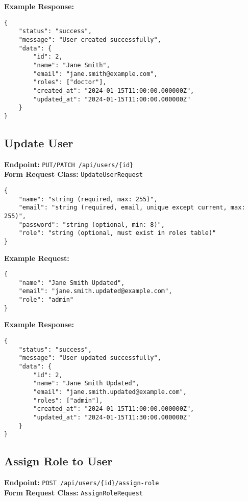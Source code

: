 \documentclass[12pt,a4paper]{article}
\begin{document}
\textbf{Example Response:}
\begin{lstlisting}[caption=Create User Example Response]
{
    "status": "success",
    "message": "User created successfully",
    "data": {
        "id": 2,
        "name": "Jane Smith",
        "email": "jane.smith@example.com",
        "roles": ["doctor"],
        "created_at": "2024-01-15T11:00:00.000000Z",
        "updated_at": "2024-01-15T11:00:00.000000Z"
    }
}
\end{lstlisting}

\subsection{Update User}
\textbf{Endpoint:} \texttt{PUT/PATCH /api/users/\{id\}}\\
\textbf{Form Request Class:} \texttt{UpdateUserRequest}

\begin{lstlisting}[caption=Update User Request Body]
{
    "name": "string (required, max: 255)",
    "email": "string (required, email, unique except current, max: 255)",
    "password": "string (optional, min: 8)",
    "role": "string (optional, must exist in roles table)"
}
\end{lstlisting}

\textbf{Example Request:}
\begin{lstlisting}[caption=Update User Example Request]
{
    "name": "Jane Smith Updated",
    "email": "jane.smith.updated@example.com",
    "role": "admin"
}
\end{lstlisting}

\textbf{Example Response:}
\begin{lstlisting}[caption=Update User Example Response]
{
    "status": "success",
    "message": "User updated successfully",
    "data": {
        "id": 2,
        "name": "Jane Smith Updated",
        "email": "jane.smith.updated@example.com",
        "roles": ["admin"],
        "created_at": "2024-01-15T11:00:00.000000Z",
        "updated_at": "2024-01-15T11:30:00.000000Z"
    }
}
\end{lstlisting}

\subsection{Assign Role to User}
\textbf{Endpoint:} \texttt{POST /api/users/\{id\}/assign-role}\\
\textbf{Form Request Class:} \texttt{AssignRoleRequest}
\end{document}
